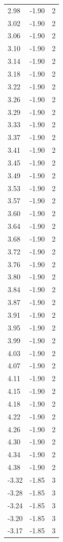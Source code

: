 \begin{longtable}{lrr}
  2.98 & -1.90 & 2 \\
  3.02 & -1.90 & 2 \\
  3.06 & -1.90 & 2 \\
  3.10 & -1.90 & 2 \\
  3.14 & -1.90 & 2 \\
  3.18 & -1.90 & 2 \\
  3.22 & -1.90 & 2 \\
  3.26 & -1.90 & 2 \\
  3.29 & -1.90 & 2 \\
  3.33 & -1.90 & 2 \\
  3.37 & -1.90 & 2 \\
  3.41 & -1.90 & 2 \\
  3.45 & -1.90 & 2 \\
  3.49 & -1.90 & 2 \\
  3.53 & -1.90 & 2 \\
  3.57 & -1.90 & 2 \\
  3.60 & -1.90 & 2 \\
  3.64 & -1.90 & 2 \\
  3.68 & -1.90 & 2 \\
  3.72 & -1.90 & 2 \\
  3.76 & -1.90 & 2 \\
  3.80 & -1.90 & 2 \\
  3.84 & -1.90 & 2 \\
  3.87 & -1.90 & 2 \\
  3.91 & -1.90 & 2 \\
  3.95 & -1.90 & 2 \\
  3.99 & -1.90 & 2 \\
  4.03 & -1.90 & 2 \\
  4.07 & -1.90 & 2 \\
  4.11 & -1.90 & 2 \\
  4.15 & -1.90 & 2 \\
  4.18 & -1.90 & 2 \\
  4.22 & -1.90 & 2 \\
  4.26 & -1.90 & 2 \\
  4.30 & -1.90 & 2 \\
  4.34 & -1.90 & 2 \\
  4.38 & -1.90 & 2 \\
  -3.32 & -1.85 & 3 \\
  -3.28 & -1.85 & 3 \\
  -3.24 & -1.85 & 3 \\
  -3.20 & -1.85 & 3 \\
  -3.17 & -1.85 & 3 \\

\end{longtable}
